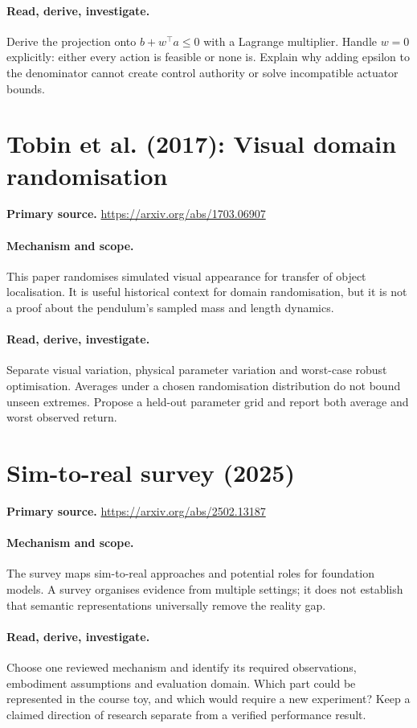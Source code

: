 \documentclass[11pt]{scrartcl}
\begin{document}
\paragraph{Read, derive, investigate.} Derive the projection onto $b+w^\top a\leq0$ with a Lagrange multiplier. Handle $w=0$ explicitly: either every action is feasible or none is. Explain why adding epsilon to the denominator cannot create control authority or solve incompatible actuator bounds.

\section{Tobin et al. (2017): Visual domain randomisation}
\noindent\textbf{Primary source.} \url{https://arxiv.org/abs/1703.06907}

\paragraph{Mechanism and scope.} This paper randomises simulated visual appearance for transfer of object localisation. It is useful historical context for domain randomisation, but it is not a proof about the pendulum's sampled mass and length dynamics.

\paragraph{Read, derive, investigate.} Separate visual variation, physical parameter variation and worst-case robust optimisation. Averages under a chosen randomisation distribution do not bound unseen extremes. Propose a held-out parameter grid and report both average and worst observed return.

\section{Sim-to-real survey (2025)}
\noindent\textbf{Primary source.} \url{https://arxiv.org/abs/2502.13187}

\paragraph{Mechanism and scope.} The survey maps sim-to-real approaches and potential roles for foundation models. A survey organises evidence from multiple settings; it does not establish that semantic representations universally remove the reality gap.

\paragraph{Read, derive, investigate.} Choose one reviewed mechanism and identify its required observations, embodiment assumptions and evaluation domain. Which part could be represented in the course toy, and which would require a new experiment? Keep a claimed direction of research separate from a verified performance result.
\end{document}
